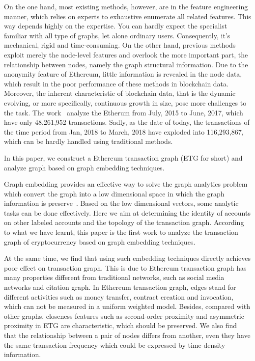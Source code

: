 On the one hand, most existing methods, however, are in the feature engineering manner, which relies on experts to exhaustive enumerate all related features. This way depends highly on the expertise. You can hardly expect the specialist familiar with all type of graphs, let alone ordinary users. Consequently, it's mechanical, rigid and time-consuming. On the other hand, previous methods exploit merely the node-level features and overlook the more important part, the relationship between nodes, namely the graph structural information. Due to  the anonymity feature of Ethereum, little information is revealed in the node data, which result in the poor performance of these methods in blockchain data. Moreover, the inherent characteristic of blockchain data, that is the dynamic evolving, or more specifically, continuous growth in size, pose more challenges to the task. The work~\cite{chen2018infocom} analyze the Etherum from July, 2015 to June, 2017, which have only 48,261,952 transactions. Sadly, as the date of today, the transactions of the time period from Jan, 2018 to March, 2018 have exploded into 116,293,867, which can be hardly handled using traditional methods.




 In this paper, we construct a Ethereum transaction graph (ETG for short) and analyze graph based on graph embedding techniques.

 Graph embedding provides an effective way to solve the graph analytics problem which convert the graph into a low dimensional space in which the graph information is preserve~\cite{cai2018comprehensive}. Based on the low dimensional vectors, some analytic tasks can be done effectively. Here we aim at determining the identity of accounts on other labeled accounts and the topology of the transaction graph. According to what we have learnt, this paper is the first work to analyze the transaction graph of cryptocurrency based on graph embedding techniques.

At the same time, we find that using such embedding techniques directly achieves poor effect on transaction graph. This is due to Ethereum transaction graph has many properties different from traditional networks, such as social media networks and citation graph. In Ethereum transaction graph, edges stand for different activities such as money transfer, contract creation and invocation, which can not be measured in a uniform weighted model. Besides, compared with other graphs, closeness features such as second-order proximity and asymmetric proximity in ETG are characteristic, which should be preserved. We also find that the relationship between a pair of nodes differs from another, even they have the same transaction frequency which could be expressed by time-density information.

